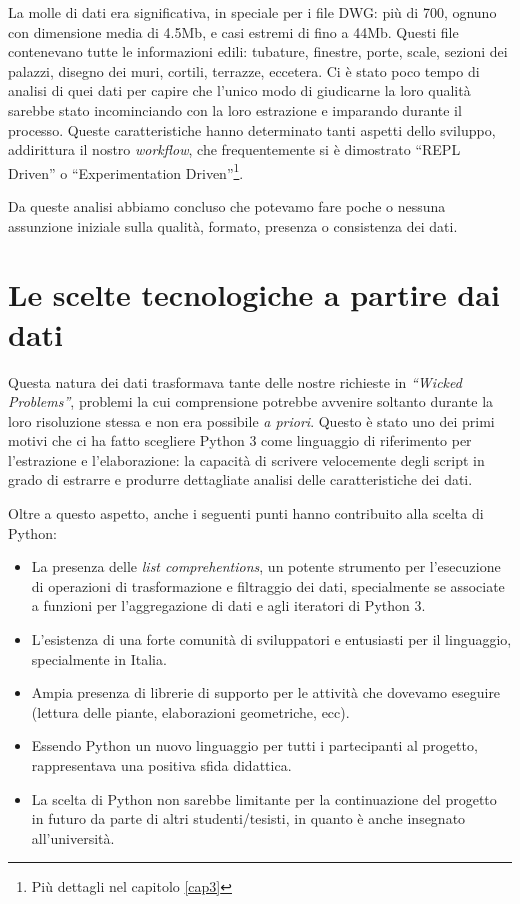 \documentclass[12pt]{report}
\begin{document}
La molle di dati era significativa, in speciale per i file DWG: più di 700, ognuno con dimensione media di 4.5Mb, e casi estremi di fino a 44Mb. Questi file contenevano tutte le informazioni edili: tubature, finestre, porte, scale, sezioni dei palazzi, disegno dei muri, cortili, terrazze, eccetera. Ci è stato poco tempo di analisi di quei dati per capire che l'unico modo di giudicarne la loro qualità sarebbe stato incominciando con la loro estrazione e imparando durante il processo. Queste caratteristiche hanno determinato tanti aspetti dello sviluppo, addirittura il nostro \textit{workflow}, che frequentemente si è dimostrato ``REPL Driven'' o ``Experimentation Driven''\footnote{Più dettagli nel capitolo \ref{cap3}}.

Da queste analisi abbiamo concluso che potevamo fare poche o nessuna assunzione iniziale sulla qualità, formato, presenza o consistenza dei dati.

\section{Le scelte tecnologiche a partire dai dati}

Questa natura dei dati trasformava tante delle nostre richieste in \textit{``Wicked Problems''}, problemi la cui comprensione potrebbe avvenire soltanto durante la loro risoluzione stessa e non era possibile \textit{a priori}. Questo è stato uno dei primi motivi che ci ha fatto scegliere Python 3 come linguaggio di riferimento per l'estrazione e l'elaborazione: la capacità di scrivere velocemente degli script in grado di estrarre e produrre dettagliate analisi delle caratteristiche dei dati. 

Oltre a questo aspetto, anche i seguenti punti hanno contribuito alla scelta di Python:
\begin{itemize}
  \item La presenza delle \textit{list comprehentions}, un potente strumento per l'esecuzione di operazioni di trasformazione e filtraggio dei dati, specialmente se associate a funzioni per l'aggregazione di dati e agli iteratori di Python 3.
  \item L'esistenza di una forte comunità di sviluppatori e entusiasti per il linguaggio, specialmente in Italia.
  \item Ampia presenza di librerie di supporto per le attività che dovevamo eseguire (lettura delle piante, elaborazioni geometriche, ecc).
  \item Essendo Python un nuovo linguaggio per tutti i partecipanti al progetto, rappresentava una positiva sfida didattica.
  \item La scelta di Python non sarebbe limitante per la continuazione del progetto in futuro da parte di altri studenti/tesisti, in quanto è anche insegnato all'università.
\end{itemize}
\end{document}
